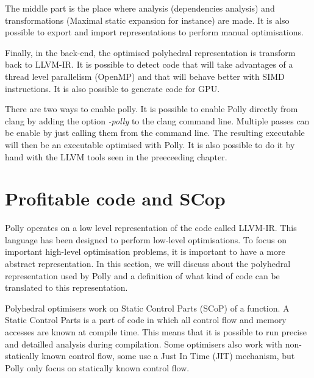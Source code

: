 The middle part is the place where analysis (dependencies analysis) and transformations (Maximal static expansion for instance) are made. It is also possible to export and import representations to perform manual optimisations.

Finally, in the back-end, the optimised polyhedral representation is transform back to LLVM-IR. It is possible to detect code that will take advantages of a thread level parallelism (OpenMP) and that will behave better with SIMD instructions. It is also possible to generate code for GPU. 

There are two ways to enable polly. It is possible to enable Polly directly from clang by adding the option \emph{-polly} to the clang command line. Multiple passes can be enable by just calling them from the command line. The resulting executable will then be an executable optimised with Polly. It is also possible to do it by hand with the LLVM tools seen in the preeceeding chapter.

\section{Profitable code and SCop}
Polly operates on a low level representation of the code called LLVM-IR. This language has been designed to perform low-level optimisations. To focus on important high-level optimisation problems, it is important to have a more abstract representation. In this section, we will discuss about the polyhedral representation used by Polly and a definition of what kind of code can be translated to this representation.

Polyhedral optimisers work on Static Control Parts (SCoP) of a function. A Static Control Parts is a part of code in which all control flow and memory accesses are known at compile time. This means that it is possible to run precise and detailled analysis during compilation. Some optimisers also work with non-statically known control flow, some use a Just In Time (JIT) mechanism, but Polly only focus on statically known control flow. 

